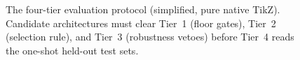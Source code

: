 \documentclass[fontsize=11pt,paper=a4]{scrbook}
\newcommand{\bg}{black}
\newcommand{\fg}{white}
\newcommand{\bg}{white}
\newcommand{\fg}{black}
\begin{document}
\pagecolor{\bg}
\color{\fg}

\begin{figure}[p]
  \centering
  \resizebox{0.75\textwidth}{!}{}
  \caption{The four-tier evaluation protocol (simplified, pure native TikZ). Candidate architectures must clear Tier~1 (floor gates), Tier~2 (selection rule), and Tier~3 (robustness vetoes) before Tier~4 reads the one-shot held-out test sets.}
  \label{fig:protocol-funnel}
\end{figure}
\end{document}
